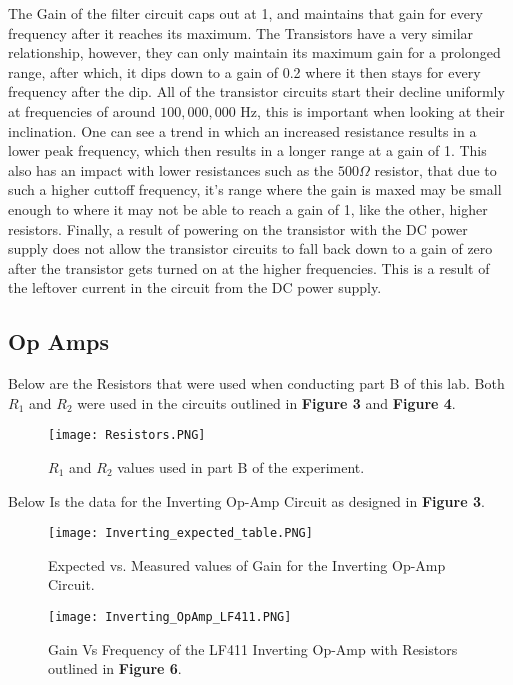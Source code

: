 \documentclass[journal]{IEEEtran}
\begin{document}
The Gain of the filter circuit caps out at 1, and maintains that gain for every frequency after
it reaches its maximum. The Transistors have a very similar relationship, however, they can only
maintain its maximum gain for a prolonged range, after which, it dips down to a gain of 0.2 
where it then stays for every frequency after the dip. All of the transistor circuits start
their decline uniformly at frequencies of around $100,000,000$ Hz, this is important when 
looking at their inclination. One can see a trend in which an increased resistance results 
in a lower peak frequency, which then results in a longer range at a gain of 1. This also has an impact with lower resistances such as the $500 \Omega$ 
resistor, that due to such a higher cuttoff frequency, it's range where the gain is maxed 
may be small enough to where it may not be able to reach a gain of 1, like the other, 
higher resistors. Finally, a result of powering on the transistor with the DC power supply
does not allow the transistor circuits to fall back down to a gain of zero after the 
transistor gets turned on at the higher frequencies. This is a result of the leftover
current in the circuit from the DC power supply.

\subsection{Op Amps}
    Below are the Resistors that were used when conducting part B of this lab. Both 
    $R_1$ and $R_2$ were used in the circuits outlined in \textbf{Figure 3} 
    and \textbf{Figure 4}.

    \begin{figure}[H]
        \centering
        \texttt{[image: Resistors.PNG]}
        \caption{$R_1$ and $R_2$ values used in part B of the experiment.}
    \end{figure}

    Below Is the data for the Inverting Op-Amp Circuit as designed in \textbf{Figure 3}.

    \begin{figure}[H]
        \centering
        \texttt{[image: Inverting\_expected\_table.PNG]}
        \caption{Expected vs. Measured values of Gain for the Inverting Op-Amp Circuit.}
    \end{figure}

    \begin{figure}[H]
        \centering
        \texttt{[image: Inverting\_OpAmp\_LF411.PNG]}
        \caption{Gain Vs Frequency of the LF411 Inverting Op-Amp with Resistors outlined in 
        \textbf{Figure 6}.}
    \end{figure}
    
\end{document}
